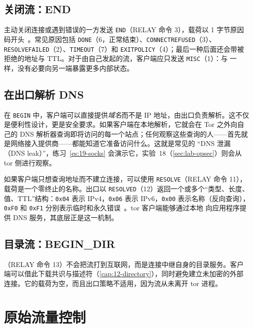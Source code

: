 \subsection{关闭流：END}

主动关闭连接或遇到错误的一方发送 \texttt{END}（RELAY 命令 3），载荷以 1 字节原因码开头~。常见原因包括 \texttt{DONE}（6，正常结束）、\texttt{CONNECTREFUSED}（3）、\texttt{RESOLVEFAILED}（2）、\texttt{TIMEOUT}（7）和 \texttt{EXITPOLICY}（4）；最后一种后面还会带被拒绝的地址与 TTL。对于由自己发起的流，客户端应只发送 \texttt{MISC}（1）：与  一样，没有必要向另一端暴露更多内部状态。

\subsection{在出口解析 DNS}\label{sec:stream-dns}

在 \texttt{BEGIN} 中，客户端可以直接提供\emph{域名}而不是 IP 地址，由出口负责解析。这不仅是便利性设计，更是安全要求。如果客户端在本地解析，它就会在 Tor 之外向自己的 DNS 解析器查询即将访问的每一个站点；任何观察这些查询的人——首先就是网络接入提供商——都能知道它准备访问什么。这就是常见的 \enquote{DNS 泄漏（DNS leak）}，练习~\ref{es:19-socks} 会演示它，实验~18（\cref{sec:lab-opsec}）则会从 tor 侧进行观察。

如果客户端只想查询地址而不建立连接，可以使用 \texttt{RESOLVE}（RELAY 命令 11），载荷是一个零终止的名称。出口以 \texttt{RESOLVED}（12）返回一个或多个“类型、长度、值、TTL”结构：\texttt{0x04} 表示 IPv4，\texttt{0x06} 表示 IPv6，\texttt{0x00} 表示名称（反向查询），\texttt{0xF0} 和 \texttt{0xF1} 分别表示临时和永久错误~。tor 客户端能够通过本地  向应用程序提供 DNS 服务，其底层正是这一机制。

\subsection{目录流：BEGIN\_DIR}

（RELAY 命令 13）不会把流打到互联网，而是连接中继自身的目录服务。客户端可以借此下载共识与描述符（\cref{cap:12-directory}），同时避免建立未加密的外部连接。它的载荷为空，而且出口策略不适用，因为流从未离开 tor 进程。

\section{原始流量控制}\label{sec:flusso-classico}


